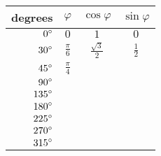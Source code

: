 \begin{tabular}{rccc} \toprule
degrees       & $\varphi$       & $\cos\varphi$        & $\sin\varphi$ \\\midrule
${0}^{\circ}$  & $0$             & $1$                  & $0$           \\[6pt]
${30}^{\circ}$ & $\frac{\pi}{6}$ & $\frac{\sqrt{3}}{2}$ & $\frac{1}{2}$ \\[6pt]
${45}^{\circ}$ & $\frac{\pi}{4}$                                        \\[6pt]
${90}^{\circ}$                                                          \\[6pt]
${135}^{\circ}$                                                         \\[6pt]
${180}^{\circ}$                                                         \\[6pt]
${225}^{\circ}$                                                         \\[6pt]
${270}^{\circ}$                                                         \\[6pt]
${315}^{\circ}$                                                         \\\bottomrule
\end{tabular}
